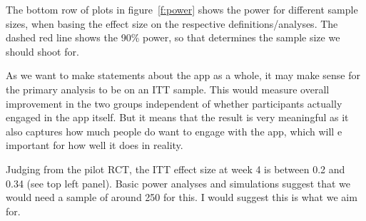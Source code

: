The bottom row of plots in figure~\ref{f:power} shows the power for different
sample sizes, when basing the effect size on the respective
definitions/analyses. The dashed red line shows the 90\% power, so that
determines the sample size we should shoot for. 

As we want to make statements about the app as a whole, it may make sense for
the primary analysis to be on an ITT sample. This would measure overall
improvement in the two groups independent of whether participants actually
engaged in the app itself. But it means that the result is very meaningful as it
also captures how much people do want to engage with the app, which will e
important for how well it does in reality. 

Judging from the pilot RCT, the ITT effect size at week 4 is between 0.2 and
0.34 (see top left panel). Basic power analyses and simulations suggest that we
would need a sample of around 250 for this. I would suggest this is what we aim
for. 

